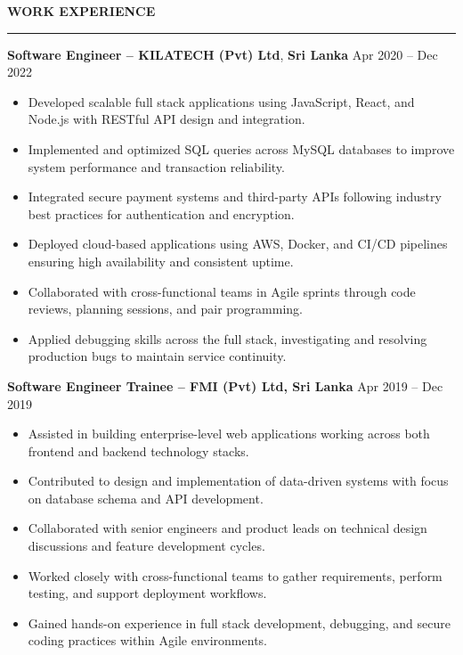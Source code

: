 \documentclass[10pt,letterpaper]{article}
\begin{document}
\textbf{WORK EXPERIENCE}\\[-8pt]
\noindent\rule{\textwidth}{1pt}

\vspace{-2pt}

\textbf{Software Engineer -- KILATECH (Pvt) Ltd}, \textbf{Sri Lanka} \hfill Apr 2020 -- Dec 2022

\vspace{-1pt}

\begin{itemize}
\item Developed scalable full stack applications using JavaScript, React, and Node.js with RESTful API design and integration.
\item Implemented and optimized SQL queries across MySQL databases to improve system performance and transaction reliability.
\item Integrated secure payment systems and third-party APIs following industry best practices for authentication and encryption.
\item Deployed cloud-based applications using AWS, Docker, and CI/CD pipelines ensuring high availability and consistent uptime.
\item Collaborated with cross-functional teams in Agile sprints through code reviews, planning sessions, and pair programming.
\item Applied debugging skills across the full stack, investigating and resolving production bugs to maintain service continuity.
\end{itemize}

\textbf{Software Engineer Trainee -- FMI (Pvt) Ltd, Sri Lanka} \hfill Apr 2019 -- Dec 2019

\vspace{-1pt}

\begin{itemize}
\item Assisted in building enterprise-level web applications working across both frontend and backend technology stacks.
\item Contributed to design and implementation of data-driven systems with focus on database schema and API development.
\item Collaborated with senior engineers and product leads on technical design discussions and feature development cycles.
\item Worked closely with cross-functional teams to gather requirements, perform testing, and support deployment workflows.
\item Gained hands-on experience in full stack development, debugging, and secure coding practices within Agile environments.
\end{itemize}
\end{document}

